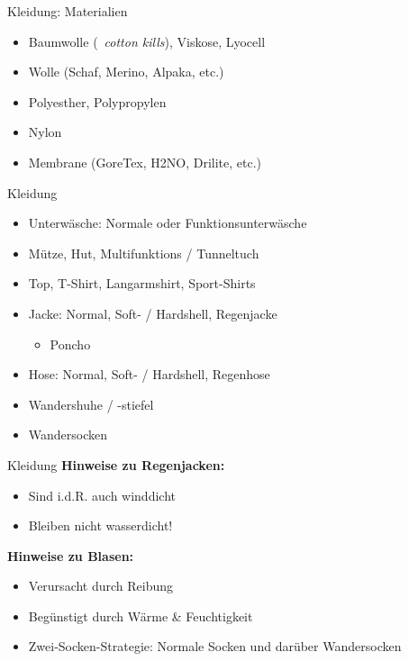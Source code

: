 \documentclass{beamer}
\begin{document}
			\begin{frame}{Kleidung: Materialien}
				\begin{itemize}
					\item Baumwolle (\textrightarrow\ \textit{cotton kills}), Viskose, Lyocell
					\item Wolle (Schaf, Merino, Alpaka, etc.)
					\item Polyesther, Polypropylen
					\item Nylon
					\item Membrane (GoreTex, H2NO, Drilite, etc.)
				\end{itemize}
			\end{frame}
			
			\begin{frame}{Kleidung}
				\begin{itemize}
					\item Unterwäsche: Normale oder Funktionsunterwäsche
					\item Mütze, Hut, Multifunktions / Tunneltuch
					\item Top, T-Shirt, Langarmshirt, Sport-Shirts
					\item Jacke: Normal, Soft- / Hardshell, Regenjacke
					\begin{itemize}
						\item Poncho
					\end{itemize}
					\item Hose: Normal, Soft- / Hardshell, Regenhose
					\item Wandershuhe / -stiefel
					\item Wandersocken
				\end{itemize}
			\end{frame}
				
			\begin{frame}{Kleidung}
				\textbf{Hinweise zu Regenjacken:}
				\begin{itemize}
					\item Sind i.d.R. auch winddicht
					\item Bleiben nicht wasserdicht!
				\end{itemize}
				\pause
				\vspace{0.2cm}
				\textbf{Hinweise zu Blasen:}
				\begin{itemize}
					\item Verursacht durch Reibung
					\item Begünstigt durch Wärme \& Feuchtigkeit
					\item Zwei-Socken-Strategie: Normale Socken und darüber Wandersocken
				\end{itemize}
			\end{frame}
			
\end{document}
